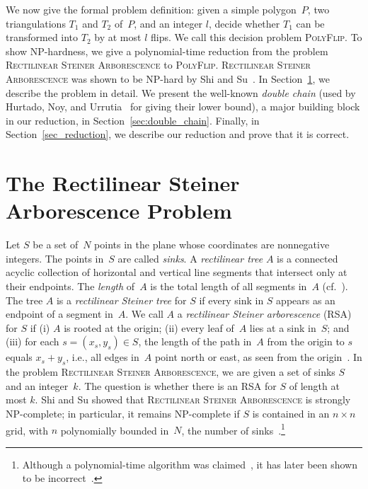 \documentclass[a4paper,11pt]{article}
\begin{document}
We now give the formal problem definition:
given a simple polygon~$P$, two triangulations 
$T_1$ and $T_2$ of~$P$, and an integer $l$, decide whether
$T_1$ can be transformed into $T_2$ by at most $l$ flips.
We call this decision problem \textsc{PolyFlip}.
To show NP-hardness, we give a polynomial-time reduction from
the problem \textsc{Rectilinear Steiner Arborescence} to \textsc{PolyFlip}.
\textsc{Rectilinear Steiner Arborescence} was shown to be NP-hard by Shi and Su~\cite{shi_su}.
In Section~\ref{sec:RSA}, we describe the problem in detail. 
We present the well-known \emph{double chain}
(used by Hurtado, Noy, and Urrutia~\cite{hurtado_noy_urrutia} for giving their lower bound), a major 
building block in our reduction, in Section~\ref{sec:double_chain}.
Finally, in Section~\ref{sec_reduction}, we describe our reduction
and prove that it is correct.

\section{The Rectilinear Steiner Arborescence Problem}
\label{sec:RSA}
Let $S$ be a set of~$N$ points in the plane whose coordinates are nonnegative integers. 
The points in~$S$ are called \emph{sinks}. 
A \emph{rectilinear tree} $A$ is a connected acyclic collection of horizontal 
and vertical line segments that intersect only at their endpoints.
The \emph{length} of~$A$ is the total length of all segments in~$A$ 
(cf.~\cite[p.~205]{hwang}).
The tree $A$ is a \emph{rectilinear Steiner tree} for $S$ if every sink in 
$S$ appears as an endpoint of a segment in~$A$. 
We call $A$ a \emph{rectilinear Steiner arborescence} (RSA) for $S$ if (i) $A$ is 
rooted at the origin; (ii) every leaf of~$A$ lies at a sink in~$S$; and (iii) for 
each $s = (x_s,y_s) \in S$, the length of the path in~$A$ from the origin to $s$ 
equals $x_s+y_s$, i.e., all edges in~$A$ point north or east, as seen from the origin~\cite{rao}.
In the problem 
\textsc{Rectilinear Steiner Arborescence}, we are given a set of sinks $S$ and an integer~$k$. The question
is whether there is an RSA for $S$ of length at most $k$. 
Shi and Su showed that \textsc{Rectilinear Steiner Arborescence} is strongly 
NP-complete; in particular, it 
remains NP-complete if $S$ is contained in an $n \times n$ grid, with $n$ 
polynomially bounded in~$N$, the number of
sinks~\cite{shi_su}.\footnote{Although a  polynomial-time algorithm was 
claimed~\cite{trubin}, it has later been shown to be incorrect~\cite{rao}.}
\end{document}
